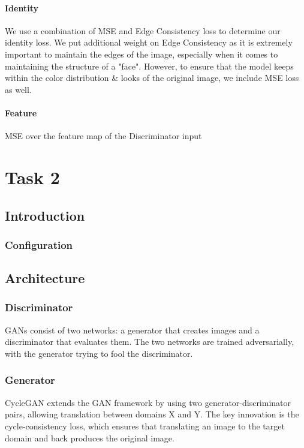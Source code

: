 \documentclass[twoside,english,notitlepage]{report}
\begin{document}
\subsubsection{Identity}
We use a combination of MSE and Edge Consistency loss to determine our identity loss. We put additional weight on Edge Consistency as it is extremely important to maintain the edges of the image, especially when it comes to maintaining the structure of a "face". However, to ensure that the model keeps within the color distribution \& looks of the original image, we include MSE loss as well. 

\subsubsection{Feature}
MSE over the feature map of the Discriminator input



\chapter{Task 2}
\section{Introduction}



\subsection{Configuration}



\section{Architecture}
\subsection{Discriminator}
GANs consist of two networks: a generator that creates images and a discriminator that evaluates them. The two networks are trained adversarially, with the generator trying to fool the discriminator.

\subsection{Generator}
CycleGAN extends the GAN framework by using two generator-discriminator pairs, allowing translation between domains X and Y. The key innovation is the cycle-consistency loss, which ensures that translating an image to the target domain and back produces the original image.
\end{document}
